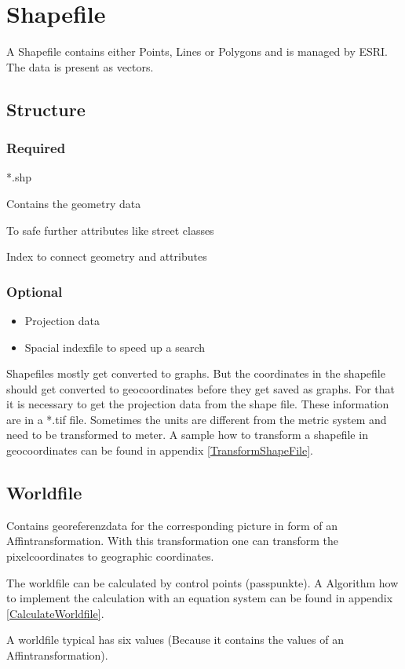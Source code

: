\chapter{Shapefile}
\label{ch:shapefile}

A Shapefile contains either Points, Lines or Polygons and is managed by ESRI. The data is present as vectors.

\section{Structure}
\label{ch:shapefile:sec:structure}

\subsection{Required}
\begin{labeling}[:]{*.shp}
    \item[*.shp]Contains the geometry data
    \item[*.dbf]To safe further attributes like street classes
    \item[*.shx]Index to connect geometry and attributes
\end{labeling}

\subsection{Optional}
\begin{itemize}
    \item Projection data
    \item Spacial indexfile to speed up a search
\end{itemize}

Shapefiles mostly get converted to graphs.
But the coordinates in the shapefile should get converted to geocoordinates before they get saved as graphs.
For that it is necessary to get the projection data from the shape file.
These information are in a *.tif file.
Sometimes the units are different from the metric system and need to be transformed to meter.
A sample how to transform a shapefile in geocoordinates can be found in appendix \ref{TransformShapeFile}.

\section{Worldfile}
\label{sec:worldfile}
Contains georeferenzdata for the corresponding picture in form of an Affintransformation.
With this transformation one can transform the pixelcoordinates to geographic coordinates. \par
The worldfile can be calculated by control points (passpunkte). A Algorithm how to implement
the calculation with an equation system can be found in appendix \ref{CalculateWorldfile}.
\par
A worldfile typical has six values (Because it contains the values of an Affintransformation).

